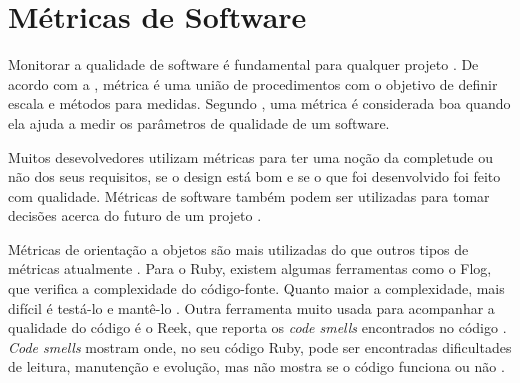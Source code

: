 \section{Métricas de Software}

Monitorar a qualidade de software é fundamental para qualquer projeto \cite{prmm}. De acordo com a , métrica é uma união de procedimentos com o objetivo de definir escala e métodos para medidas. Segundo , uma métrica é considerada boa quando ela ajuda a medir os parâmetros de qualidade de um software. 

Muitos desevolvedores utilizam métricas para ter uma noção da completude ou não dos seus requisitos, se o design está bom e se o que foi desenvolvido foi feito com qualidade. Métricas de software também podem ser utilizadas para tomar decisões acerca do futuro de um projeto \cite{metrics-book}.

Métricas de orientação a objetos são mais utilizadas do que outros tipos de métricas atualmente \cite{danijel}. Para o Ruby, existem algumas ferramentas como o Flog, que verifica a complexidade do código-fonte. Quanto maior a complexidade, mais difícil é testá-lo e mantê-lo \cite{flog}. Outra ferramenta muito usada para acompanhar a qualidade do código é o Reek, que reporta os \textit{code smells} encontrados no código \cite{reek}. \textit{Code smells} mostram onde, no seu código Ruby, pode ser encontradas dificultades de leitura, manutenção e evolução, mas não mostra se o código funciona ou não \cite{codesmells}.
